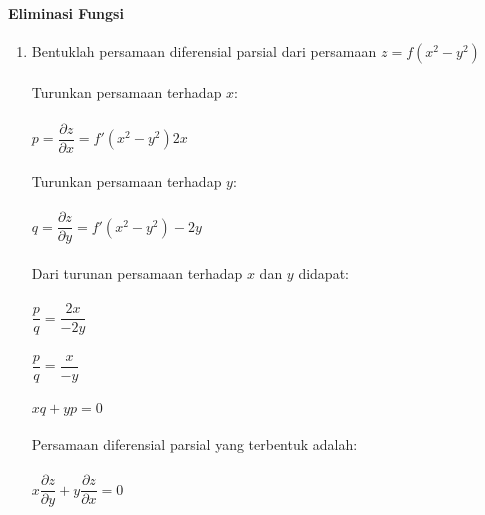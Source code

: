 \paragraph{Eliminasi Fungsi}
\label{parff:PDPEF}

\begin{enumerate}[1.]

	\item Bentuklah persamaan diferensial parsial dari persamaan \begin{math} z = f(x^{2} - y^{2}) \end{math} \\ \\
	Turunkan persamaan terhadap \begin{math} x \end{math}: \\ \\
	\begin{math} p = \dfrac{\partial z}{\partial x} = f'(x^{2} - y^{2}) 2x \end{math} \\ \\
	Turunkan persamaan terhadap \begin{math} y \end{math}: \\ \\
	\begin{math} q = \dfrac{\partial z}{\partial y} = f'(x^{2} - y^{2}) -2y \end{math} \\ \\
	Dari turunan persamaan terhadap \begin{math} x \end{math} dan  \begin{math} y \end{math} didapat: \\ \\
	\begin{math} \dfrac{p}{q} = \dfrac{2x}{-2y} \end{math} \\ \\
	\begin{math} \dfrac{p}{q} = \dfrac{x}{-y} \end{math} \\ \\
	\begin{math} xq + yp = 0 \end{math} \\ \\
	Persamaan diferensial parsial yang terbentuk adalah: \\ \\
	\begin{math} x \dfrac{\partial z}{\partial y} + y \dfrac{\partial z}{\partial x} = 0 \end{math}

\end{enumerate}

